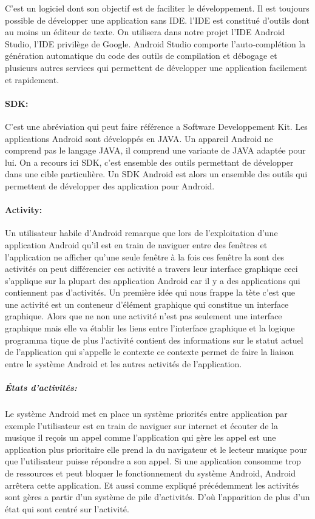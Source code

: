 C'est un logiciel dont son objectif est de faciliter le développement. Il est
toujours possible de développer une application sans IDE.
l'IDE est constitué d'outils dont au moins un éditeur de texte.
On utilisera dans notre projet l'IDE Android Studio, l'IDE privilège de Google.
Android Studio comporte l'auto-complétion la génération automatique  du code des
outils de compilation et débogage et plusieurs autres services qui permettent de
développer une application facilement et rapidement.

\paragraph{SDK:}

C’est une abréviation qui peut faire référence a Software Developpement Kit.
Les applications Android sont développés en JAVA\@. Un appareil Android ne
comprend pas le langage JAVA, il comprend une variante de JAVA adaptée pour lui.
On a recours ici SDK, c'est ensemble des outils permettant de développer dans
une cible particulière. Un SDK Android est alors un ensemble des outils qui
permettent de développer des application pour Android.

\paragraph{Activity:}

Un utilisateur habile d'Android remarque que lors de l'exploitation d'une
application Android qu'il est en train de naviguer entre des fenêtres et
l'application ne afficher qu'une seule fenêtre à la fois ces fenêtre la sont
des activités on peut différencier ces activité a travers leur interface
graphique ceci s'applique sur la plupart des application Android car il y a
des applications qui contiennent pas d'activités. Un première idée qui nous
frappe la tète c'est que une activité est un conteneur d'élément graphique qui
constitue un interface graphique. Alors que ne non une activité n'est pas
seulement une interface graphique mais elle va établir les liens entre
l'interface graphique et la logique programma tique de plus l'activité
contient des informations sur le statut actuel de l'application qui s'appelle le
contexte ce contexte permet de faire la liaison entre le système Android et les
autres activités de l'application.

\subparagraph{États d'activités:}

Le système Android met en place un système priorités entre application
par exemple l'utilisateur est en train de naviguer sur internet et écouter
de la musique il reçois un appel comme l'application qui gère les appel est
une application plus prioritaire elle prend la du navigateur et le lecteur
musique pour que l'utilisateur puisse répondre a son appel. Si une application
consomme trop de ressources et peut bloquer le fonctionnement du système Android,
Android arrêtera cette application. Et aussi comme expliqué précédemment
les activités sont gères a partir d'un système de pile d'activités.
D'où l'apparition de plus d'un état qui sont centré sur l'activité.


